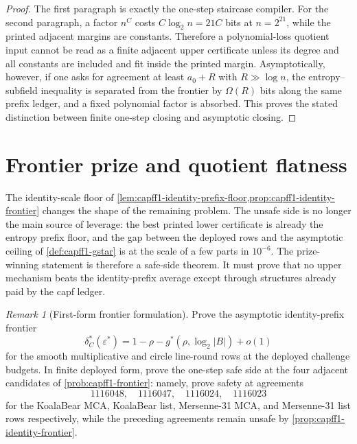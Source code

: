 \documentclass[11pt]{article}
\theoremstyle{definition}
\theoremstyle{remark}
\newtheorem{remark}[remark]{Remark}
\newcommand{\B}{B}
\begin{document}
\begin{proof}
The first paragraph is exactly the one-step staircase compiler.  For the second paragraph, a factor $n^C$ costs $C\log_2 n=21C$ bits at $n=2^{21}$, while the printed adjacent margins are constants.  Therefore a polynomial-loss quotient input cannot be read as a finite adjacent upper certificate unless its degree and all constants are included and fit inside the printed margin.  Asymptotically, however, if one asks for agreement at least $a_0+R$ with $R\gg\log n$, the entropy--subfield inequality is separated from the frontier by $\Omega(R)$ bits along the same prefix ledger, and a fixed polynomial factor is absorbed.  This proves the stated distinction between finite one-step closing and asymptotic closing.
\end{proof}


\providecommand{\Avg}{\operatorname{Avg}}
\providecommand{\Supp}{\operatorname{Supp}}
\providecommand{\poly}{\operatorname{poly}}
\providecommand{\Gap}{\operatorname{Gap}}

\section{Frontier prize and quotient flatness}\label{sec:capfpr-prize}

The identity-scale floor of \cref{lem:capff1-identity-prefix-floor,prop:capff1-identity-frontier} changes the shape of the remaining problem.  The unsafe side is no longer the main source of leverage: the best printed lower certificate is already the entropy prefix floor, and the gap between the deployed rows and the asymptotic ceiling of \cref{def:capff1-gstar} is at the scale of a few parts in $10^{-6}$.  The prize-winning statement is therefore a safe-side theorem.  It must prove that no upper mechanism beats the identity-prefix average except through structures already paid by the capf ledger.

\begin{remark}[First-form frontier formulation]\label{prob:capfpr-frontier-prize}
Prove the asymptotic identity-prefix frontier
\[
        \delta_C^*(\varepsilon^*)
        =1-\rho-g^*(\rho,\log_2|\B|)+o(1)
\]
for the smooth multiplicative and circle line-round rows at the deployed challenge budgets.  In finite deployed form, prove the one-step safe side at the four adjacent candidates of \cref{prob:capff1-frontier}: namely, prove safety at agreements
\[
1116048,\quad 1116047,\quad 1116024,\quad 1116023
\]
for the KoalaBear MCA, KoalaBear list, Mersenne-31 MCA, and Mersenne-31 list rows respectively, while the preceding agreements remain unsafe by \cref{prop:capff1-identity-frontier}.
\end{remark}
\end{document}
